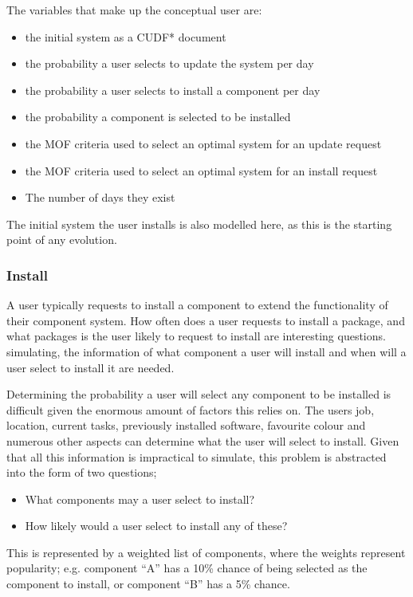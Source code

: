 The variables that make up the conceptual user are: 
\begin{itemize}
  \item the initial system as a CUDF* document
  \item the probability a user selects to update the system per day
  \item the probability a user selects to install a component per day
  \item the probability a component is selected to be installed
  \item the MOF criteria used to select an optimal system for an update request
  \item the MOF criteria used to select an optimal system for an install request
  \item The number of days they exist
\end{itemize}

The initial system the user installs is also modelled here, as this is the starting point of any evolution.

\subsubsection{Install}
A user typically requests to install a component to extend the functionality of their component system.
How often does a user requests to install a package, and what packages is the user likely to request to install are interesting questions. 
simulating, the information of what component a user will install and when will a user select to install it are needed. 

Determining the probability a user will select any component to be installed is difficult given the enormous amount of factors this relies on.
The users job, location, current tasks, previously installed software, favourite colour and numerous other aspects can determine what the user will select to install.
Given that all this information is impractical to simulate, this problem is abstracted into the form of two questions;
\begin{itemize}
  \item What components may a user select to install?
  \item How likely would a user select to install any of these?
\end{itemize}
This is represented by a weighted list of components, where the weights represent popularity;
e.g. component ``A'' has a 10\% chance of being selected as the component to install, or component ``B'' has a 5\% chance.

